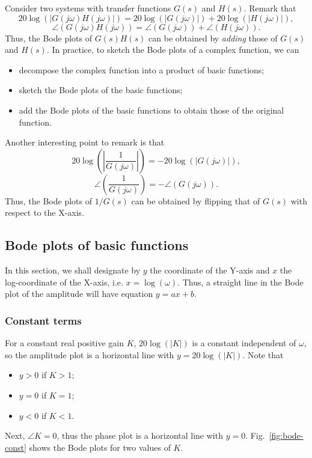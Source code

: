 \documentclass[a4paper,11pt]{report}
\theoremstyle{definition}
\begin{document}
Consider two systems with transfer functions $G(s)$ and $H(s)$. Remark
that
\[
20\log(|G(j\omega)H(j\omega)|) = 20\log(|G(j\omega)|) + 20 \log(|H(j\omega)|),
\]
\[
\angle(G(j\omega)H(j\omega)) = \angle(G(j\omega)) + \angle(H(j\omega)).
\]
Thus, the Bode plots of $G(s)H(s)$ can be obtained by \emph{adding}
those of $G(s)$ and $H(s)$. In practice, to sketch the Bode plots of a
complex function, we can
\begin{itemize}
\item decompose the complex function into a product of basic functions;
\item sketch the Bode plots of the basic functions;
\item add the Bode plots of the basic functions to obtain those of the
  original function.
\end{itemize}

Another interesting point to remark is that
\[
20\log\left(\left|\frac{1}{G(j\omega)}\right|\right) = -20\log(|G(j\omega)|),
\]
\[
\angle\left(\frac{1}{G(j\omega)}\right) = -\angle(G(j\omega)).
\]
Thus, the Bode plots of $1/G(s)$ can be obtained by flipping that of
$G(s)$ with respect to the X-axis.

\subsection{Bode plots of basic functions}

In this section, we shall designate by $y$ the coordinate of the
Y-axis and $x$ the log-coordinate of the X-axis,
i.e. $x=\log(\omega)$. Thus, a straight line in the Bode plot of the
amplitude will have equation $y=ax+b$.

\subsubsection{Constant terms}

For a constant real positive gain $K$, $20\log(|K|)$ is a constant
independent of $\omega$, so the amplitude plot is a horizontal line
with $y=20\log(|K|)$. Note that
\begin{itemize}
\item $y>0$ if $K>1$;
\item $y=0$ if $K=1$;
\item $y<0$ if $K<1$.
\end{itemize}

Next, $\angle K=0$, thus the phase plot is a horizontal line with
$y=0$. Fig.~\ref{fig:bode-const} shows the Bode plots for two values
of $K$.
\end{document}
